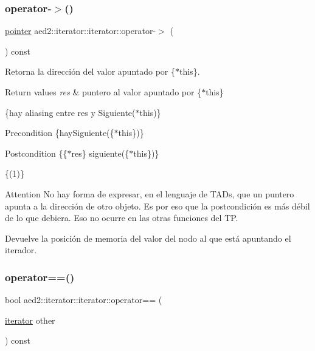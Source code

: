 \subsubsection{\texorpdfstring{operator-\/$>$()}{operator->()}}
{\footnotesize\ttfamily \hyperlink{classaed2_1_1iterator_1_1iterator_add8c8243f6b0e3cb7b67ce06757df53b}{pointer} aed2\+::iterator\+::iterator\+::operator-\/$>$ (\begin{DoxyParamCaption}{ }\end{DoxyParamCaption}) const\hspace{0.3cm}{\ttfamily [inline]}}



Retorna la dirección del valor apuntado por \{$\ast$this\}. 


\begin{DoxyRetVals}{Return values}
{\em res} & puntero al valor apuntado por \{$\ast$this\}\\
\hline
\end{DoxyRetVals}
\{hay aliasing entre res y Siguiente($\ast$this)\}

\begin{DoxyPrecond}{Precondition}
\{hay\+Siguiente(\{$\ast$this\})\} 
\end{DoxyPrecond}
\begin{DoxyPostcond}{Postcondition}
\{\{$\ast$res\}  siguiente(\{$\ast$this\})\}
\end{DoxyPostcond}
\{(1)\}

\begin{DoxyAttention}{Attention}
No hay forma de expresar, en el lenguaje de T\+A\+Ds, que un puntero apunta a la dirección de otro objeto. Es por eso que la postcondición es más débil de lo que debiera. Eso no ocurre en las otras funciones del TP.
\end{DoxyAttention}
Devuelve la posición de memoria del valor del nodo al que está apuntando el iterador. \mbox{\label{classaed2_1_1iterator_1_1iterator_a565d56436e9490edab1ea31803af34ae}} 
\subsubsection{\texorpdfstring{operator==()}{operator==()}}
{\footnotesize\ttfamily bool aed2\+::iterator\+::iterator\+::operator== (\begin{DoxyParamCaption}\item[{\hyperlink{classaed2_1_1iterator_1_1iterator}{iterator}}]{other }\end{DoxyParamCaption}) const\hspace{0.3cm}{\ttfamily [inline]}}



